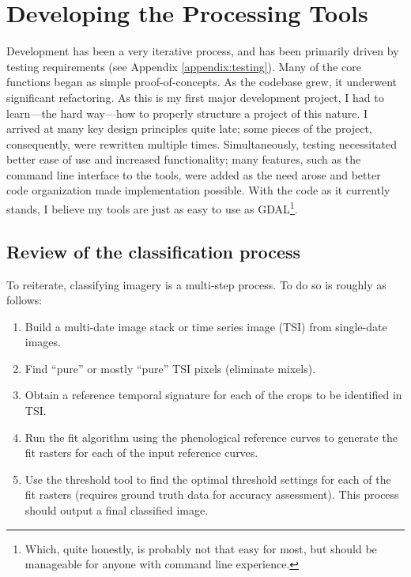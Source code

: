 \chapter{Developing the Processing Tools}
\label{appendix:tools}

Development has been a very iterative process, and has been primarily driven by testing requirements (see Appendix \ref{appendix:testing}). Many of the core functions began as simple proof-of-concepts. As the codebase grew, it underwent significant refactoring. As this is my first major development project, I had to learn---the hard way---how to properly structure a project of this nature. I arrived at many key design principles quite late; some pieces of the project, consequently, were rewritten multiple times. Simultaneously, testing necessitated better ease of use and increased functionality; many features, such as the command line interface to the tools, were added as the need arose and better code organization made implementation possible. With the code as it currently stands, I believe my tools are just as easy to use as GDAL\footnote{Which, quite honestly, is probably not that easy for most, but should be manageable for anyone with command line experience.}.

\section{Review of the classification process}

To reiterate, classifying imagery is a multi-step process. To do so is roughly as follows:

\begin{enumerate}
  \item Build a multi-date image stack or time series image (TSI) from single-date images.
  \item Find “pure” or mostly “pure” TSI pixels (eliminate mixels).
  \item Obtain a reference temporal signature for each of the crops to be identified in TSI.
  \item Run the fit algorithm using the phenological reference curves to generate the fit rasters for each of the input reference curves.
  \item Use the threshold tool to find the optimal threshold settings for each of the fit rasters (requires ground truth data for accuracy assessment). This process should output a final classified image.
\end{enumerate}

